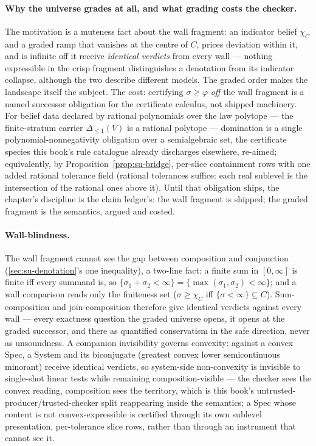 \paragraph{Why the universe grades at all, and what grading costs
the checker.} The motivation is a muteness fact
about the wall fragment: an indicator belief $\chi_C$ and a graded
ramp that vanishes at the centre of $C$, prices deviation within it,
and is infinite off it receive \emph{identical verdicts} from every
wall --- nothing expressible in the crisp fragment
distinguishes a denotation from its indicator collapse, although the
two describe different models. The graded order makes the landscape
itself the subject. The cost: certifying $\sigma \ge \varphi$ \emph{off} the wall
fragment is a named successor obligation for the certificate
calculus, not shipped machinery. For belief data declared by
rational polynomials over the law polytope --- the finite-stratum
carrier $\Delta_{\le 1}(V)$ is a rational polytope --- domination is
a single polynomial-nonnegativity obligation over a semialgebraic
set, the certificate species this book's rule catalogue already
discharges elsewhere, re-aimed; equivalently, by
Proposition~\ref{prop:su-bridge}, per-slice containment rows with
one added rational tolerance field (rational tolerances suffice:
each real sublevel is the intersection of the rational ones above
it). Until that obligation ships,
the chapter's discipline is the claim ledger's: the wall fragment
is shipped; the graded fragment is the semantics, argued and
costed.

\paragraph{Wall-blindness.} The wall fragment cannot see the gap
between composition and conjunction
(\autoref{sec:su-denotation}'s one inequality), a two-line fact: a finite sum in $[0,\infty]$ is finite iff every
summand is, so $\{\sigma_1 + \sigma_2 < \infty\} =
\{\max(\sigma_1,\sigma_2) < \infty\}$; and a wall comparison reads
only the finiteness set ($\sigma \ge \chi_C$ iff
$\{\sigma < \infty\} \subseteq C$). Sum-composition and
join-composition therefore give identical verdicts against every
wall --- every exactness question the graded universe opens, it
opens at the graded successor, and there as quantified conservatism
in the safe direction, never as unsoundness. A companion
invisibility governs convexity: against a convex Spec, a System and
its biconjugate (greatest convex lower semicontinuous minorant)
receive identical verdicts, so system-side non-convexity is
invisible to single-shot linear tests while remaining
composition-visible --- the checker sees the convex reading,
composition sees the territory, which is this book's
untrusted-producer/trusted-checker split reappearing inside the
semantics; a Spec whose content is not convex-expressible is
certified through its own sublevel presentation, per-tolerance
slice rows, rather than through an instrument that cannot see it.

